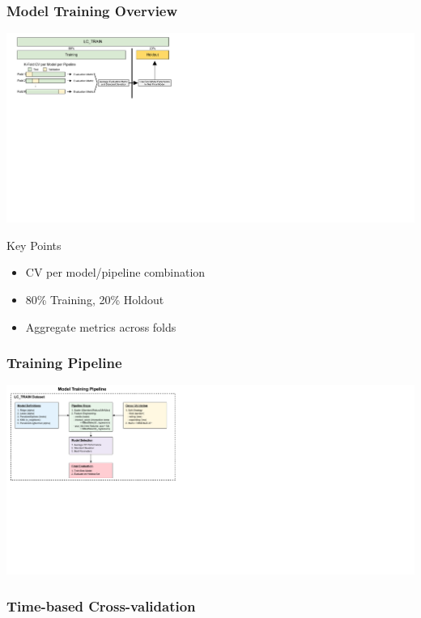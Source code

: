 \documentclass{beamer}
\begin{document}
\begin{frame}
\frametitle{Model Training Overview}
    \includegraphics[width=\textwidth]{images/modeling/model_building.pdf}
    
    \begin{alertblock}{Key Points}
        \begin{itemize}
        \item CV per model/pipeline combination
        \item 80\% Training, 20\% Holdout
        \item Aggregate metrics across folds
        \end{itemize}
    \end{alertblock}
\end{frame}

\begin{frame}
\frametitle{Training Pipeline}
    \vspace{-0.2cm}
    \includegraphics[width=\textwidth, height=0.9\textheight]{images/modeling/data_flow.pdf}
    \vspace{-0.5cm}
\end{frame}

\begin{frame}
\frametitle{Time-based Cross-validation}
\end{frame}
\end{document}
